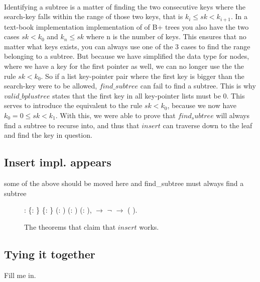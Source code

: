 \paragraph{}
Identifying a subtree is a matter of finding the two consecutive keys where the search-key falls within the range of those two keys, that is $k_i \le sk < k_{i+1}$. In a text-book implementation implementation of of B+ trees you also have the two cases $sk < k_0$ and $k_{n} \le sk$ where n is the number of keys. This ensures that no matter what keys exists, you can always use one of the 3 cases to find the range belonging to a subtree. But because we have simplified the data type for nodes, where we have a key for the first pointer as well, we can no longer use the the rule $sk < k_0$. So if a list key-pointer pair where the first key is bigger than the search-key were to be allowed, $find\_subtree$ can fail to find a subtree. This is why $valid\_bplustree$ states that the first key in all key-pointer lists must be 0. This serves to introduce the equivalent to the rule $sk < k_0$, because we now have $k_0 = 0 \le sk < k_1$. With this, we were able to prove that $find_subtree$ will always find a subtree to recurse into, and thus that $insert$ can traverse down to the leaf and find the key in question.

\subsection{Insert impl. appears}
some of the above should be moved here and find\_subtree must always find a subtree

\begin{figure}
  \begin{coqdoccode}
  \coqdocnoindent
    : \coqdockw{\ensuremath{\forall}} \{: \} \{: \} (:   ) (: ) (: ),\coqdoceol
  \coqdocindent{1.00em}
      \ensuremath{\rightarrow} \coqdoceol
  \coqdocindent{1.00em}
  \ensuremath{\lnot}   \ensuremath{\rightarrow} \coqdoceol
  \coqdocindent{1.00em}
     (   ).\coqdoceol
  \end{coqdoccode}
  \caption{The theorems that claim that $insert$ works.}
  \label{fig:insert_works}
\end{figure}

\subsection{Tying it together}
Fill me in.
